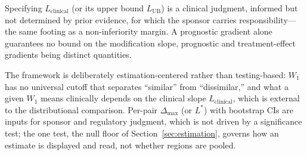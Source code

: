 \documentclass[AMA,Times1COL]{WileyNJDv5}
\begin{document}
Specifying $L_{\text{clinical}}$ (or its upper bound $L_{\text{UB}}$) is a clinical judgment, informed but not determined by prior evidence, for which the sponsor carries responsibility---the same footing as a non-inferiority margin. A prognostic gradient alone guarantees no bound on the modification slope, prognostic and treatment-effect gradients being distinct quantities.\cite{ballman2015,kent2020}

The framework is deliberately estimation-centered rather than testing-based: $W_1$ has no universal cutoff that separates ``similar'' from ``dissimilar,'' and what a given $W_1$ means clinically depends on the clinical slope $L_{\text{clinical}}$, which is external to the distributional comparison. Per-pair $\Delta_{\max}$ (or $L^*$) with bootstrap CIs are inputs for sponsor and regulatory judgment, which is not driven by a significance test;\cite{wasserstein2016} the one test, the null floor of Section~\ref{sec:estimation}, governs how an estimate is displayed and read, not whether regions are pooled.
\end{document}
